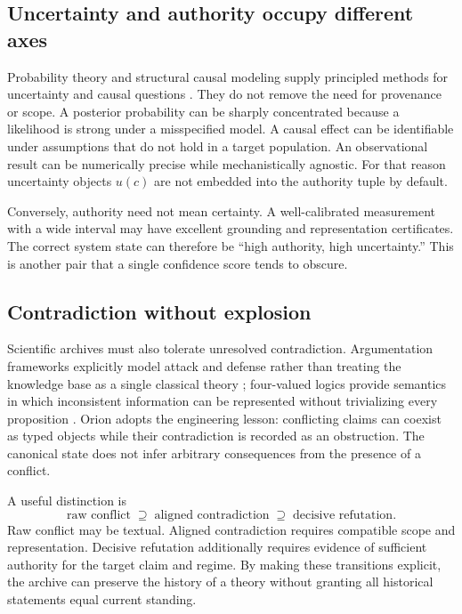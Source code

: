 \subsection{Uncertainty and authority occupy different axes}

Probability theory and structural causal modeling supply principled methods for uncertainty and causal questions \cite{pearl2009,halpern2016}. They do not remove the need for provenance or scope. A posterior probability can be sharply concentrated because a likelihood is strong under a misspecified model. A causal effect can be identifiable under assumptions that do not hold in a target population. An observational result can be numerically precise while mechanistically agnostic. For that reason uncertainty objects \(u(c)\) are not embedded into the authority tuple by default.

Conversely, authority need not mean certainty. A well-calibrated measurement with a wide interval may have excellent grounding and representation certificates. The correct system state can therefore be ``high authority, high uncertainty.'' This is another pair that a single confidence score tends to obscure.

\subsection{Contradiction without explosion}

Scientific archives must also tolerate unresolved contradiction. Argumentation frameworks explicitly model attack and defense rather than treating the knowledge base as a single classical theory \cite{dung1995}; four-valued logics provide semantics in which inconsistent information can be represented without trivializing every proposition \cite{belnap1977}. Orion adopts the engineering lesson: conflicting claims can coexist as typed objects while their contradiction is recorded as an obstruction. The canonical state does not infer arbitrary consequences from the presence of a conflict.

A useful distinction is
\[
\text{raw conflict}\;\supseteq\;\text{aligned contradiction}\;\supseteq\;\text{decisive refutation}.
\]
Raw conflict may be textual. Aligned contradiction requires compatible scope and representation. Decisive refutation additionally requires evidence of sufficient authority for the target claim and regime. By making these transitions explicit, the archive can preserve the history of a theory without granting all historical statements equal current standing.

